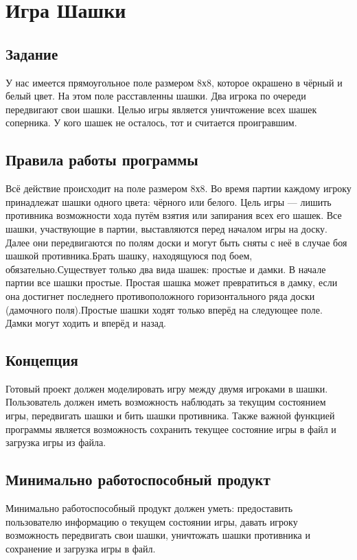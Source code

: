 \documentclass[a4paper]{article}
\begin{document}
\vfill %
\tableofcontents
\newpage

\section{Игра Шашки}
\subsection{Задание}
У нас имеется прямоугольное поле размером 8х8, которое окрашено в чёрный и белый цвет. На этом поле расставленны шашки. Два игрока по очереди передвигают свои шашки. Целью игры является уничтожение всех шашек соперника. У кого шашек не осталось, тот и считается проигравшим.

\subsection{Правила работы программы}
Всё действие происходит на поле размером 8х8. Во время партии каждому игроку принадлежат шашки одного цвета: чёрного или белого. Цель игры — лишить противника возможности хода путём взятия или запирания всех его шашек. Все шашки, участвующие в партии, выставляются перед началом игры на доску. Далее они передвигаются по полям доски и могут быть сняты с неё в случае боя шашкой противника.Брать шашку, находящуюся под боем, обязательно.Существует только два вида шашек: простые и дамки. В начале партии все шашки простые. Простая шашка может превратиться в дамку, если она достигнет последнего противоположного горизонтального ряда доски (дамочного поля).Простые шашки ходят только вперёд на следующее поле. Дамки могут ходить и вперёд и назад.

\subsection{Концепция}
Готовый проект должен моделировать игру между двумя игроками в шашки. Пользователь должен иметь возможность наблюдать за текущим состоянием игры, передвигать шашки и бить шашки противника. Также важной функцией программы является возможность сохранить текущее состояние игры в файл и загрузка игры из файла.

\subsection{Минимально работоспособный продукт}
Минимально работоспособный продукт должен уметь: предоставить пользователю информацию о текущем состоянии игры, давать игроку возможность передвигать свои шашки, уничтожать шашки противника и сохранение и загрузка игры в файл.
\end{document}
